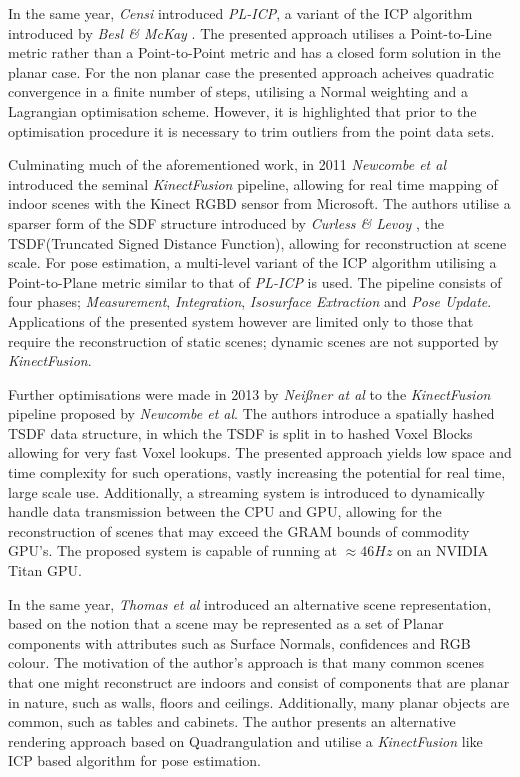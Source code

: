 In the same year, \textit{Censi} \cite{Censi2008} introduced \textit{PL-ICP}, a 
variant of the ICP algorithm introduced by \textit{Besl \& McKay} \cite{Besl1992}. 
The presented approach utilises a Point-to-Line metric rather than a Point-to-Point 
metric and has a closed form solution in the planar case. For the non planar case 
the presented approach acheives quadratic convergence in a finite number of steps, 
utilising a Normal weighting and a Lagrangian optimisation scheme. However, it is 
highlighted that prior to the optimisation procedure it is necessary to trim outliers 
from the point data sets.

Culminating much of the aforementioned work, in 2011 \textit{Newcombe et al} introduced 
the seminal \textit{KinectFusion} pipeline, allowing for real time mapping of indoor 
scenes with the Kinect RGBD sensor from Microsoft. The authors utilise a sparser form 
of the SDF structure introduced by \textit{Curless \& Levoy} \cite{Curless1996}, the 
TSDF(Truncated Signed Distance Function), allowing for reconstruction at scene scale. 
For pose estimation, a multi-level variant of the ICP algorithm utilising a Point-to-Plane 
metric similar to that of \textit{PL-ICP} \cite{Censi2008} is used. The pipeline consists 
of four phases; \textit{Measurement}, \textit{Integration}, \textit{Isosurface Extraction} 
and \textit{Pose Update}. Applications of the presented system however are limited only to 
those that require the reconstruction of static scenes; dynamic scenes are not supported 
by \textit{KinectFusion}.

Further optimisations were made in 2013 by \textit{Nei{\ss}ner at al} \cite{NieBner2013} to the 
\textit{KinectFusion} pipeline proposed by \textit{Newcombe et al}. The authors introduce a 
spatially hashed TSDF data structure, in which the TSDF is split in to hashed Voxel Blocks 
allowing for very fast Voxel lookups. The presented approach yields low space and time complexity 
for such operations, vastly increasing the potential for real time, large scale use. Additionally, 
a streaming system is introduced to dynamically handle data transmission between the CPU and GPU, 
allowing for the reconstruction of scenes that may exceed the GRAM bounds of commodity GPU's. The 
proposed system is capable of running at $\approx46Hz$ on an NVIDIA Titan GPU.

In the same year, \textit{Thomas et al} \cite{Thomas2013} introduced an alternative scene 
representation, based on the notion that a scene may be represented as a set of Planar 
components with attributes such as Surface Normals, confidences and RGB colour. The motivation 
of the author's approach is that many common scenes that one might reconstruct are indoors and 
consist of components that are planar in nature, such as walls, floors and ceilings. Additionally, 
many planar objects are common, such as tables and cabinets. The author presents an alternative 
rendering approach based on Quadrangulation \cite{QUAD} and utilise a \textit{KinectFusion} 
\cite{Newcombe2011} like ICP based algorithm for pose estimation.

